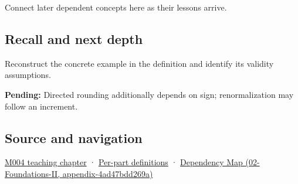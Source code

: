 Connect later dependent concepts here as their lessons arrive.

\subsection{Recall and next depth}\label{appendix-b572b631069b-recall-and-next-depth}

Reconstruct the concrete example in the definition and identify its validity assumptions.

\textbf{Pending:} Directed rounding additionally depends on sign; renormalization may follow an increment.

\subsection{Source and navigation}\label{appendix-b572b631069b-source-and-navigation}

\hyperref[01-foundations-i-ch001-a-stretching-ruler-for-real-valued-quantities]{M004 teaching chapter} · \hyperref[appendix-fd090d982a15-m004---parts-61-76]{Per-part definitions} · \href{../02-Foundations-II/main.pdf\#nameddest=appendix-4ad47bdd269a}{Dependency Map (02-Foundations-II, appendix-4ad47bdd269a)}
